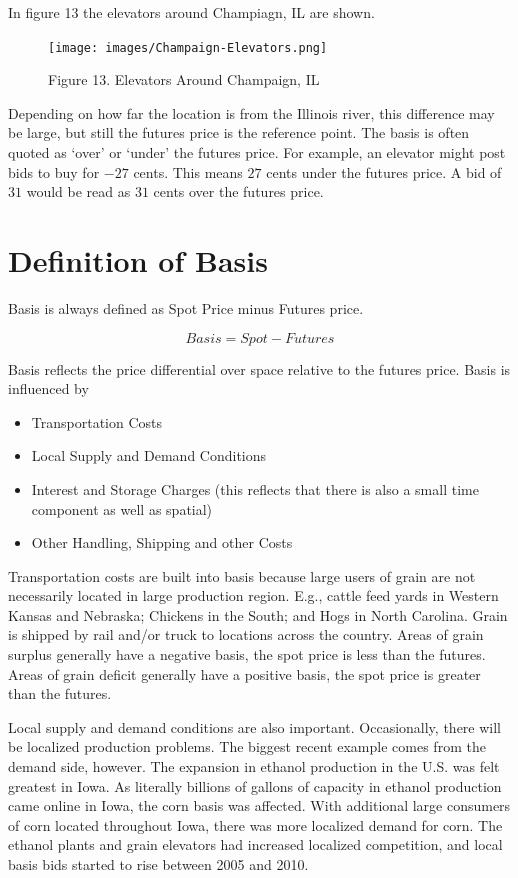 \documentclass[
]{book}
\providecommand{\tightlist}{%
  \setlength{\itemsep}{0pt}\setlength{\parskip}{0pt}}
\begin{document}
In figure 13 the elevators around Champiagn, IL are shown.

\begin{figure}
\centering
\texttt{[image: images/Champaign-Elevators.png]}
\caption{Figure 13. Elevators Around Champaign, IL}
\end{figure}

Depending on how far the location is from the Illinois river, this difference may be large, but still the futures price is the reference point. The basis is often quoted as `over' or `under' the futures price. For example, an elevator might post bids to buy for \(-27\) cents. This means \(27\) cents under the futures price. A bid of \(31\) would be read as \(31\) cents over the futures price.

\hypertarget{definition-of-basis}{%
\section{Definition of Basis}\label{definition-of-basis}}

Basis is always defined as Spot Price minus Futures price.

\[Basis = Spot - Futures\]

Basis reflects the price differential over space relative to the futures price. Basis is influenced by

\begin{itemize}
\tightlist
\item
  Transportation Costs
\item
  Local Supply and Demand Conditions
\item
  Interest and Storage Charges (this reflects that there is also a small time component as well as spatial)
\item
  Other Handling, Shipping and other Costs
\end{itemize}

Transportation costs are built into basis because large users of grain are not necessarily located in large production region. E.g., cattle feed yards in Western Kansas and Nebraska; Chickens in the South; and Hogs in North Carolina. Grain is shipped by rail and/or truck to locations across the country. Areas of grain surplus generally have a negative basis, the spot price is less than the futures. Areas of grain deficit generally have a positive basis, the spot price is greater than the futures.

Local supply and demand conditions are also important. Occasionally, there will be localized production problems. The biggest recent example comes from the demand side, however. The expansion in ethanol production in the U.S. was felt greatest in Iowa. As literally billions of gallons of capacity in ethanol production came online in Iowa, the corn basis was affected. With additional large consumers of corn located throughout Iowa, there was more localized demand for corn. The ethanol plants and grain elevators had increased localized competition, and local basis bids started to rise between 2005 and 2010.
\end{document}
